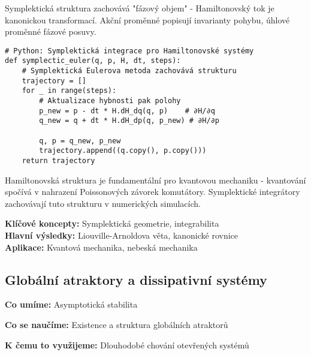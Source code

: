 \begin{intuition}
Symplektická struktura zachovává "fázový objem" - Hamiltonovský tok je kanonickou transformací. Akční proměnné popisují invarianty pohybu, úhlové proměnné fázové posuvy.
\end{intuition}

\begin{application}
\begin{verbatim}
# Python: Symplektická integrace pro Hamiltonovské systémy
def symplectic_euler(q, p, H, dt, steps):
    # Symplektická Eulerova metoda zachovává strukturu
    trajectory = []
    for _ in range(steps):
        # Aktualizace hybnosti pak polohy
        p_new = p - dt * H.dH_dq(q, p)    # ∂H/∂q
        q_new = q + dt * H.dH_dp(q, p_new) # ∂H/∂p
        
        q, p = q_new, p_new
        trajectory.append((q.copy(), p.copy()))
    return trajectory
\end{verbatim}
\end{application}

\begin{keyinsight}
Hamiltonovská struktura je fundamentální pro kvantovou mechaniku - kvantování spočívá v nahrazení Poissonových závorek komutátory. Symplektické integrátory zachovávají tuto strukturu v numerických simulacích.
\end{keyinsight}

\begin{summary}
\textbf{Klíčové koncepty:} Symplektická geometrie, integrabilita \\
\textbf{Hlavní výsledky:} Liouville-Arnoldova věta, kanonické rovnice \\
\textbf{Aplikace:} Kvantová mechanika, nebeská mechanika
\end{summary}

\spc

\subsection{Globální atraktory a dissipativní systémy}

\begin{scaffold}
\item[] \textbf{Co umíme:} Asymptotická stabilita
\item[] \textbf{Co se naučíme:} Existence a struktura globálních atraktorů  
\item[] \textbf{K čemu to využijeme:} Dlouhodobé chování otevřených systémů
\end{scaffold}

